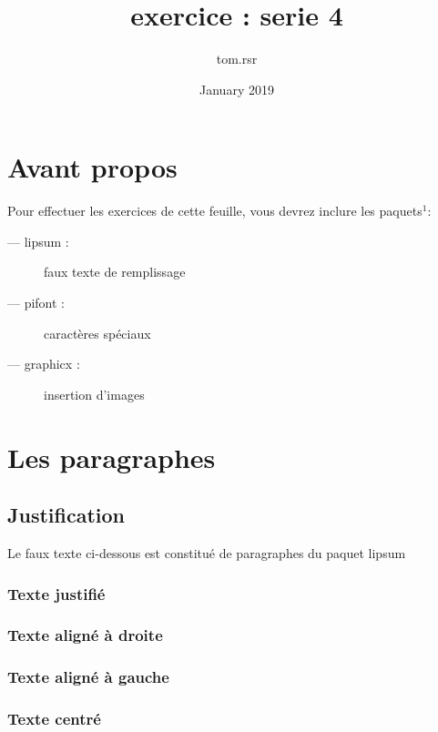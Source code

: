 \documentclass{article}
\title{exercice : serie 4}
\author{tom.rsr }
\date{January 2019}
\begin{document}
\maketitle

\section{Avant propos}
Pour effectuer les exercices de cette feuille, vous devrez inclure les paquets$^1$:

\begin{description}
\item[ --- lipsum : ] faux texte de remplissage
\item[ --- pifont : ] caractères spéciaux
\item[ --- graphicx : ] insertion d'images
\end{description}
 
\section{Les paragraphes}

\subsection{Justification}
 Le faux texte ci-dessous est constitué de paragraphes du paquet lipsum

\subsubsection{Texte justifié}
\lipsum[1]

\subsubsection{Texte aligné à droite}
\begin{flushright} 
    \lipsum[2]
\end{flushright}
\subsubsection{Texte aligné à gauche}
\begin{flushleft}
    \lipsum[3]
\end{flushleft}
\subsubsection{Texte centré}
\begin{center}
    \lipsum[4]
\end{center}
\end{document}
